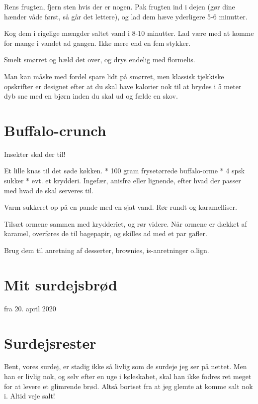 \documentclass[
]{book}
\begin{document}
Rens frugten, fjern sten hvis der er nogen. Pak frugten ind i dejen (gør dine hænder våde først, så går det lettere), og lad dem hæve yderligere 5-6 minutter.

Kog dem i rigelige mængder saltet vand i 8-10 minutter. Lad være med at komme for mange i vandet ad gangen. Ikke mere end en fem stykker.

Smelt smørret og hæld det over, og drys endelig med flormelis.

Man kan måske med fordel spare lidt på smørret, men klassisk tjekkiske opskrifter er designet efter at du skal have kalorier nok til at brydes i 5 meter dyb sne med en bjørn inden du skal ud og fælde en skov.

\hypertarget{buffalo-crunch}{%
\section{Buffalo-crunch}\label{buffalo-crunch}}

Insekter skal der til!

Et lille knas til det søde køkken.
* 100 gram frysetørrede buffalo-orme
* 4 spsk sukker
* evt. et krydderi. Ingefær, anisfrø eller lignende, efter hvad der passer med hvad de skal serveres til.

Varm sukkeret op på en pande med en sjat vand. Rør rundt og karamelliser.

Tilsæt ormene sammen med krydderiet, og rør videre. Når ormene er dækket af karamel, overføres de til bagepapir, og skilles ad med et par gafler.

Brug dem til anretning af desserter, brownies, is-anretninger o.lign.

\hypertarget{mit-surdejsbruxf8d}{%
\section{Mit surdejsbrød}\label{mit-surdejsbruxf8d}}

fra 20. april 2020

\hypertarget{surdejsrester}{%
\section{Surdejsrester}\label{surdejsrester}}

Bent, vores surdej, er stadig ikke så livlig som de surdeje jeg ser på nettet. Men han er livlig nok, og selv efter en uge i køleskabet, skal han ikke fodres ret meget for at levere et glimrende brød. Altså bortset fra at jeg glemte at komme salt nok i. Altid veje salt!
\end{document}
